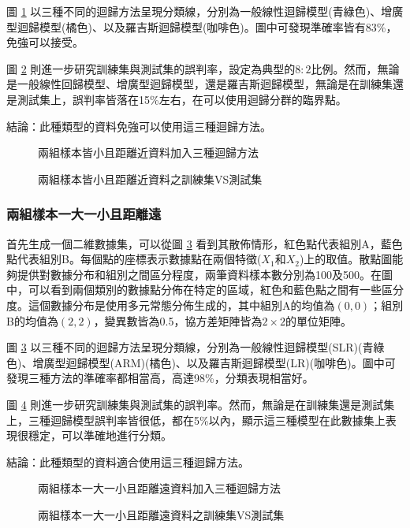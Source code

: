 圖 \ref{fig:rdn8-LARline} 以三種不同的迴歸方法呈現分類線，分別為一般線性迴歸模型(青綠色)、增廣型迴歸模型(橘色)、以及羅吉斯迴歸模型(咖啡色)。圖中可發現準確率皆有83\%，免強可以接受。

圖 \ref{fig:rdn8-LARline2} 則進一步研究訓練集與測試集的誤判率，設定為典型的$8:2$比例。然而，無論是一般線性回歸模型、增廣型迴歸模型，還是羅吉斯迴歸模型，無論是在訓練集還是測試集上，誤判率皆落在15\%左右，在可以使用迴歸分群的臨界點。

結論：此種類型的資料免強可以使用這三種迴歸方法。
\begin{figure}[h]
    \caption{兩組樣本皆小且距離近資料加入三種迴歸方法}
    \label{fig:rdn8-LARline}
\end{figure}
\begin{figure}[h]
    \caption{兩組樣本皆小且距離近資料之訓練集VS測試集}
    \label{fig:rdn8-LARline2}
\end{figure}
\subsubsection{兩組樣本一大一小且距離遠}

首先生成一個二維數據集，可以從圖 \ref{fig:rdn9-LARline} 看到其散佈情形，紅色點代表組別A，藍色點代表組別B。每個點的座標表示數據點在兩個特徵($X_1$和$X_2$)上的取值。散點圖能夠提供對數據分布和組別之間區分程度，兩筆資料樣本數分別為100及500。在圖中，可以看到兩個類別的數據點分佈在特定的區域，紅色和藍色點之間有一些區分度。這個數據分布是使用多元常態分佈生成的，其中組別A的均值為$(0, 0)$；組別B的均值為$(2, 2)$，變異數皆為0.5，協方差矩陣皆為$2 \times 2$的單位矩陣。

圖 \ref{fig:rdn9-LARline} 以三種不同的迴歸方法呈現分類線，分別為一般線性迴歸模型(SLR)(青綠色)、增廣型迴歸模型(ARM)(橘色)、以及羅吉斯迴歸模型(LR)(咖啡色)。圖中可發現三種方法的準確率都相當高，高達98\%，分類表現相當好。

圖 \ref{fig:rdn9-LARline2} 則進一步研究訓練集與測試集的誤判率。然而，無論是在訓練集還是測試集上，三種迴歸模型誤判率皆很低，都在5\%以內，顯示這三種模型在此數據集上表現很穩定，可以準確地進行分類。

結論：此種類型的資料適合使用這三種迴歸方法。
\begin{figure}[H]
    \caption{兩組樣本一大一小且距離遠資料加入三種迴歸方法}
    \label{fig:rdn9-LARline}
\end{figure}
\begin{figure}[H]
    \caption{兩組樣本一大一小且距離遠資料之訓練集VS測試集}
    \label{fig:rdn9-LARline2}
\end{figure}


